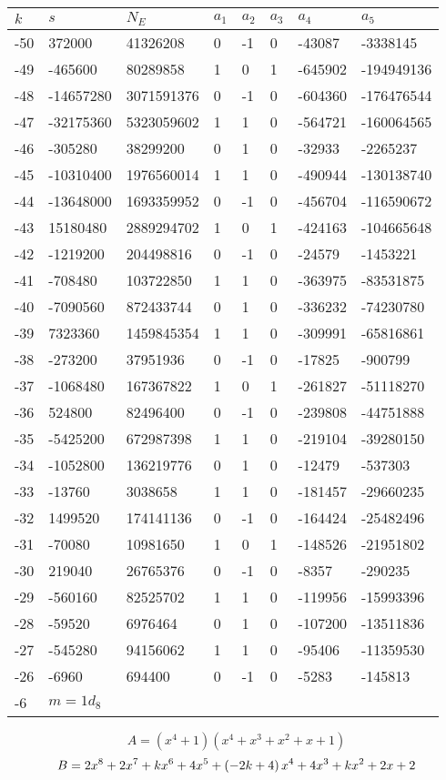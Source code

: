 \documentclass{amsart}
\begin{document}
\begin{longtable}{|l|l|l|lllll|}
\hline
$k$ & $s$ & $N_E$ & $a_1$ & $a_2$ & $a_3$ & $a_4$ & $a_5$\\
\hline
-50&372000&41326208&0&-1&0&-43087&-3338145\\
-49&-465600&80289858&1&0&1&-645902&-194949136\\
-48&-14657280&3071591376&0&-1&0&-604360&-176476544\\
-47&-32175360&5323059602&1&1&0&-564721&-160064565\\
-46&-305280&38299200&0&1&0&-32933&-2265237\\
-45&-10310400&1976560014&1&1&0&-490944&-130138740\\
-44&-13648000&1693359952&0&-1&0&-456704&-116590672\\
-43&15180480&2889294702&1&0&1&-424163&-104665648\\
-42&-1219200&204498816&0&-1&0&-24579&-1453221\\
-41&-708480&103722850&1&1&0&-363975&-83531875\\
-40&-7090560&872433744&0&1&0&-336232&-74230780\\
-39&7323360&1459845354&1&1&0&-309991&-65816861\\
-38&-273200&37951936&0&-1&0&-17825&-900799\\
-37&-1068480&167367822&1&0&1&-261827&-51118270\\
-36&524800&82496400&0&-1&0&-239808&-44751888\\
-35&-5425200&672987398&1&1&0&-219104&-39280150\\
-34&-1052800&136219776&0&1&0&-12479&-537303\\
-33&-13760&3038658&1&1&0&-181457&-29660235\\
-32&1499520&174141136&0&-1&0&-164424&-25482496\\
-31&-70080&10981650&1&0&1&-148526&-21951802\\
-30&219040&26765376&0&-1&0&-8357&-290235\\
-29&-560160&82525702&1&1&0&-119956&-15993396\\
-28&-59520&6976464&0&1&0&-107200&-13511836\\
-27&-545280&94156062&1&1&0&-95406&-11359530\\
-26&-6960&694400&0&-1&0&-5283&-145813\\
-6&$m=1d_{8}$&&\multicolumn{5}{c|}{}\\
\hline
\end{longtable}
$$A=(x^4
 + 1)(x^4
 + x^3
 + x^2
 + x
 + 1)$$
$$B=2\*x^8
 + 2\*x^7
 + k\*x^6
 + 4\*x^5
 + \left(-2\*k
 + 4\right) \*x^4
 + 4\*x^3
 + k\*x^2
 + 2\*x
 + 2$$
\end{document}
